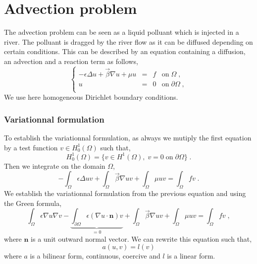 %

\section{Advection problem}
\label{sec:tuto-myadvection}

The advection problem can be seen as a liquid polluant which is injected in a river.
The polluant is dragged by the river flow as it can be diffused depending on 
certain conditions. This can be described by an equation containing a diffusion, an advection and
a reaction term as follows,
%
\begin{equation}
\left\{
\begin{array}{rcll}
-\epsilon\Delta  u + \vec\beta \nabla  u + \mu u & = & f & \text{on}\; \Omega \;, \\
                         u  & = & 0 & \text{on}\; \partial\Omega \;, \\
\end{array}
\right.
\label{eq:tuto-adv}
\end{equation}
%
We use here homogeneous Dirichlet boundary conditions.

\subsubsection{Variationnal formulation}

To establish the variationnal formulation, as always we mutiply the first equation by a
test function $v\in H_0^1(\Omega)$ such that,
\[
    H_0^1(\Omega) = \{ v\in H^1(\Omega),\; v=0 \; \text{on} \; \partial\Omega \} \;.
\]
Then we integrate on the domain $\Omega$,
%
\begin{equation}
- \int_\Omega \epsilon\Delta u v
+ \int_\Omega \vec\beta \nabla u v
+ \int_\Omega \mu u v
= \int_\Omega f v \;.
\end{equation}
%
We establish the variationnal formulation from the previous equation and using the Green formula,
%
\begin{equation}
\int_\Omega \epsilon \nabla u \nabla v
- \underbrace{\int_{\partial\Omega} \epsilon (\nabla u \cdot \mathbf n) v}_{=0}
+ \int_\Omega \vec\beta \nabla u v
+ \int_\Omega \mu u v
= \int_\Omega f v \;,
\label{eq:tuto-adv-varform}
\end{equation}
%
where $\mathbf n$ is a unit outward normal vector. We can rewrite this equation such that,
%
\begin{equation}
    a(u,v) = l(v)
\label{eq:tuto-adv-bilform}
\end{equation}
%
where $a$ is a bilinear form, continuous, coercive and $l$ is a linear form.


